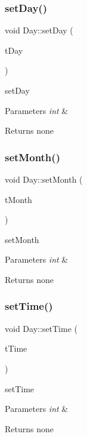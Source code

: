 \subsubsection{\texorpdfstring{set\+Day()}{setDay()}}
{\footnotesize\ttfamily void Day\+::set\+Day (\begin{DoxyParamCaption}\item[{int}]{t\+Day }\end{DoxyParamCaption})}

set\+Day 
\begin{DoxyParams}{Parameters}
{\em int} & \\
\hline
\end{DoxyParams}
\begin{DoxyReturn}{Returns}
none 
\end{DoxyReturn}
\mbox{\label{class_day_a74898e6abbb0bc18e87bd6abef2be13c}} 
\subsubsection{\texorpdfstring{set\+Month()}{setMonth()}}
{\footnotesize\ttfamily void Day\+::set\+Month (\begin{DoxyParamCaption}\item[{int}]{t\+Month }\end{DoxyParamCaption})}

set\+Month 
\begin{DoxyParams}{Parameters}
{\em int} & \\
\hline
\end{DoxyParams}
\begin{DoxyReturn}{Returns}
none 
\end{DoxyReturn}
\mbox{\label{class_day_ab6b9dd83a44385bbfda6fdf30cadc0df}} 
\subsubsection{\texorpdfstring{set\+Time()}{setTime()}}
{\footnotesize\ttfamily void Day\+::set\+Time (\begin{DoxyParamCaption}\item[{int}]{t\+Time }\end{DoxyParamCaption})}

set\+Time 
\begin{DoxyParams}{Parameters}
{\em int} & \\
\hline
\end{DoxyParams}
\begin{DoxyReturn}{Returns}
none 
\end{DoxyReturn}
\mbox{\label{class_day_aee9321ee73becce827c858697cf69815}} 
